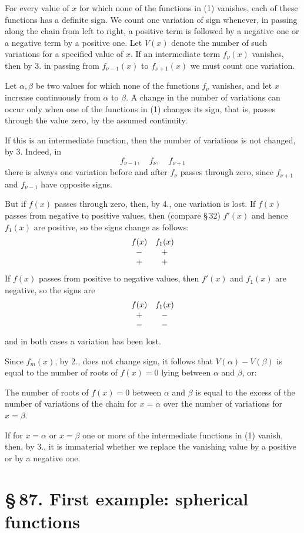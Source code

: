 \documentclass[11pt]{article}
\providecommand{\sect}[2]{\section*{\S\,#1. #2}}
\begin{document}
For every value of $x$ for which none of the functions in (1) vanishes, each of these functions has a definite sign. We count one variation of sign whenever, in passing along the chain from left to right, a positive term is followed by a negative one or a negative term by a positive one. Let $V(x)$ denote the number of such variations for a specified value of $x$. If an intermediate term $f_\nu(x)$ vanishes, then by 3. in passing from $f_{\nu-1}(x)$ to $f_{\nu+1}(x)$ we must count one variation.

Let $\alpha,
\beta$ be two values for which none of the functions $f_\nu$ vanishes, and let $x$ increase continuously from $\alpha$ to $\beta$. A change in the number of variations can occur only when one of the functions in (1) changes its sign, that is, passes through the value zero, by the assumed continuity.

If this is an intermediate function, then the number of variations is not changed, by 3. Indeed, in
\[
        f_{\nu-1},\quad f_\nu,
\quad f_{\nu+1}
\]
there is always one variation before and after $f_\nu$ passes through zero, since $f_{\nu+1}$ and $f_{\nu-1}$ have opposite signs.

But if $f(x)$ passes through zero, then, by 4., one variation is lost. If $f(x)$ passes from negative to positive values, then (compare \S\,32) $f'(x)$ and hence $f_1(x)$ are positive, so the signs change as follows:
\[
\begin{array}{cc}
 f(x)&f_1(x)\cr
 -&+\cr
 +&+
\end{array}
\]
If $f(x)$ passes from positive to negative values, then $f'(x)$ and $f_1(x)$ are negative, so the signs are
\[
\begin{array}{cc}
 f(x)&f_1(x)\cr
 +&-\cr
 -&-
\end{array}
\]
and in both cases a variation has been lost.

Since $f_m(x)$, by 2., does not change sign, it follows that $V(\alpha)-V(\beta)$ is equal to the number of roots of $f(x)=0$ lying between $\alpha$ and $\beta$, or:

The number of roots of $f(x)=0$ between $\alpha$ and $\beta$ is equal to the excess of the number of variations of the chain for $x=\alpha$ over the number of variations for $x=\beta$.

If for $x=\alpha$ or $x=\beta$ one or more of the intermediate functions in (1) vanish, then, by 3., it is immaterial whether we replace the vanishing value by a positive or by a negative one.

\sect{87}{First example: spherical functions}
\end{document}
